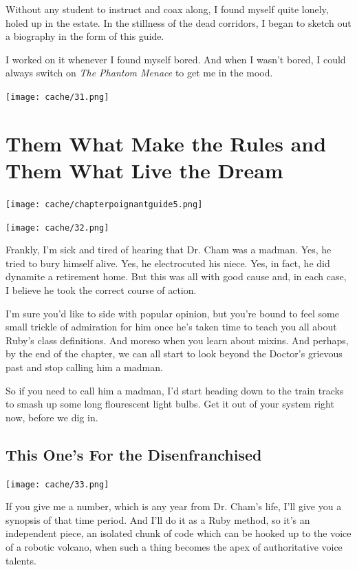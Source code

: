 \documentclass[12pt,twoside]{report}
\begin{document}
Without any student to instruct and coax along, I found myself quite
lonely, holed up in the estate.  In the stillness of the dead
corridors, I began to sketch out a biography in the form of this
guide.

I worked on it whenever I found myself bored.  And when I wasn't
bored, I could always switch on {\em The Phantom Menace} to get me in
the mood.

	\texttt{[image: cache/31.png]}

\newpage
\thispagestyle{empty}
\mbox{}

\newpage
\thispagestyle{empty}
\mbox{}


\cleartooddpage


\chapter{Them What Make the Rules and Them What Live the Dream}
\vfill
\begin{center}
  \texttt{[image: cache/chapterpoignantguide5.png]}
\end{center}
\vspace{4.6cm}
\newpage
\thispagestyle{empty}
\mbox{}
\clearpage
	\texttt{[image: cache/32.png]}

Frankly, I'm sick and tired of hearing that Dr. Cham was a madman.
Yes, he tried to bury himself alive.  Yes, he electrocuted his niece.
Yes, in fact, he did dynamite a retirement home.  But this was all
with good cause and, in each case, I believe he took the correct
course of action.

I'm sure you'd like to side with popular opinion, but you're bound to
feel some small trickle of admiration for him once he's taken time to
teach you all about Ruby's class definitions. And moreso when you
learn about mixins.  And perhaps, by the end of the chapter, we can
all start to look beyond the Doctor's grievous past and stop calling
him a madman.

So if you need to call him a madman, I'd start heading down to the
train tracks to smash up some long flourescent light bulbs.  Get it
out of your system right now, before we dig in.


\section{This One's For the Disenfranchised}


	\texttt{[image: cache/33.png]}

If you give me a number, which is any year from Dr. Cham's life, I'll
give you a synopsis of that time period.  And I'll do it as a Ruby
method, so it's an independent piece, an isolated chunk of code which
can be hooked up to the voice of a robotic volcano, when such a thing
becomes the apex of authoritative voice talents.
\end{document}
